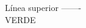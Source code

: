 \documentclass{article}
\begin{document}
Línea superior -------\\
\vspace{-3cm} VERDE
\hspace{2.4cm} 
\end{document}
